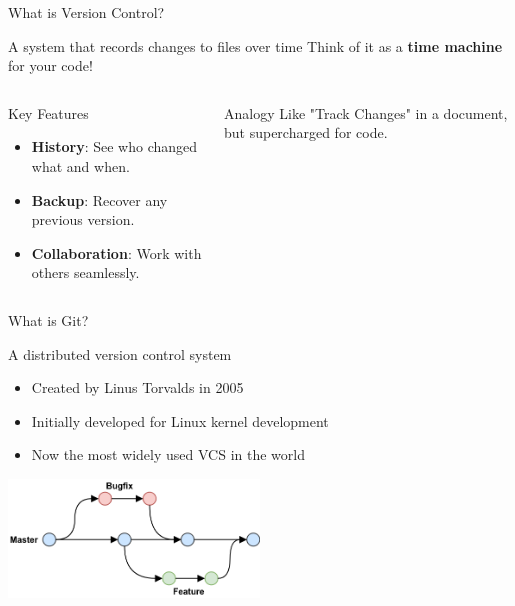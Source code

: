 \documentclass[aspectratio=169]{beamer}
\begin{document}
\begin{frame}{What is Version Control?}
  \begin{block}{A system that records changes to files over time}
    Think of it as a \textbf{time machine} for your code!
  \end{block}
  
  \begin{columns}
    \begin{column}{0.5\textwidth}
      \begin{block}{Key Features}
        \begin{itemize}
          \item \textbf{History}: See who changed what and when.
          \item \textbf{Backup}: Recover any previous version.
          \item \textbf{Collaboration}: Work with others seamlessly.
        \end{itemize}
      \end{block}
    \end{column}
    \begin{column}{0.45\textwidth}
      \begin{exampleblock}{Analogy}
        Like "Track Changes" in a document, but supercharged for code.
      \end{exampleblock}
    \end{column}
  \end{columns}
\end{frame}




\begin{frame}{What is Git?}
  \begin{block}{A distributed version control system}
    \begin{itemize}
      \item Created by Linus Torvalds in 2005
      \item Initially developed for Linux kernel development
      \item Now the most widely used VCS in the world
    \end{itemize}
  \end{block}
  
  \vspace{1em}
  \begin{center} 
    \includegraphics[width=0.5\textwidth]{figures/gitWorkflowDiagram.png}
  \end{center}
\end{frame}
\end{document}
